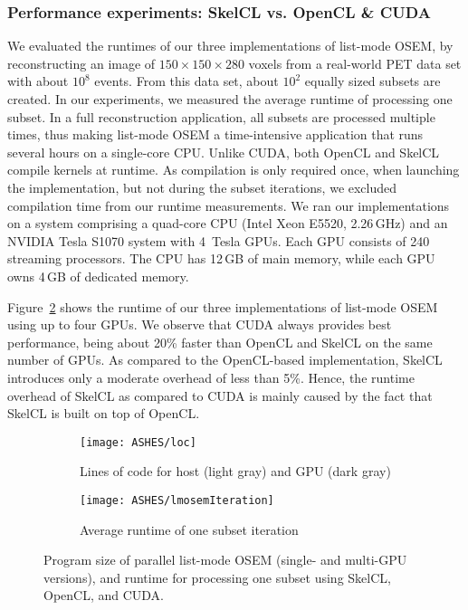 \subsubsection{Performance experiments: SkelCL vs. OpenCL \& CUDA}
\label{sec:list-mode_OSEM:runtime}

We evaluated the runtimes of our three implementations of list-mode OSEM, by reconstructing an image of $150\times 150\times 280$ voxels from a real-world PET data set with about $10^8$ events.
From this data set, about $10^2$ equally sized subsets are created.
In our experiments, we measured the average runtime of processing one subset.
In a full reconstruction application, all subsets are processed multiple times, thus making list-mode OSEM a time-intensive application that runs several hours on a single-core CPU.
Unlike CUDA, both OpenCL and SkelCL compile kernels at runtime.
As compilation is only required once, when launching the implementation, but not during the subset iterations, we excluded compilation time from our runtime measurements.
We ran our implementations on a system comprising a quad-core CPU (Intel Xeon E5520, 2.26\,GHz) and an NVIDIA Tesla S1070 system with 4~Tesla GPUs.
Each GPU consists of 240 streaming processors. %
The CPU has 12\,GB of main memory, while each GPU owns 4\,GB of dedicated memory.

Figure~\ref{fig:list-mode_OSEM:runtime} shows the runtime of our three implementations of list-mode OSEM using up to four GPUs.
We observe that CUDA always provides best performance, being about 20\% faster than OpenCL and SkelCL on the same number of GPUs.
As compared to the OpenCL-based implementation, SkelCL introduces only a moderate overhead of less than 5\%.
Hence, the runtime overhead of SkelCL as compared to CUDA is mainly caused by the fact that SkelCL is built on top of OpenCL.

\begin{figure}[tb]
  \centering
  \begin{subfigure}{.45\textwidth}
    \texttt{[image: ASHES/loc]}
    \caption{Lines of code for host (light gray) and GPU (dark gray)}
    \label{fig:list-mode_OSEM:LOC}
  \end{subfigure}
  \hfill
  \begin{subfigure}{.45\textwidth}
    \texttt{[image: ASHES/lmosemIteration]}
    \caption{Average runtime of one subset iteration}
    \label{fig:list-mode_OSEM:runtime}
  \end{subfigure}
  \caption{Program size of parallel list-mode OSEM (single- and multi-GPU versions), and runtime for processing one subset using SkelCL, OpenCL, and CUDA.}
  \label{fig:list-mode_OSEM:results}
  \bigskip
\end{figure}

